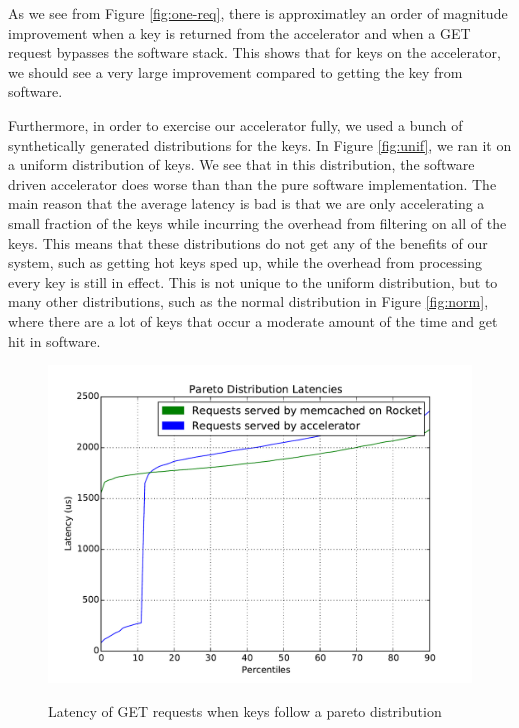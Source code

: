 As we see from Figure \ref{fig:one-req}, there is approximatley an order of magnitude
improvement when a key is returned from the accelerator and when a GET request
bypasses the software stack. This shows that for keys on the accelerator, we
should see a very large improvement compared to getting the key from software.

Furthermore, in order to exercise our accelerator fully, we used a bunch of
synthetically generated distributions for the keys. In Figure \ref{fig:unif},
we ran it on a uniform distribution of keys. We see that in this distribution,
the software driven accelerator does worse than than the pure software
implementation. The main reason that the average latency is bad is that we are
only accelerating a small fraction of the keys while incurring the overhead
from filtering on all of the keys. This means that these distributions do not
get any of the benefits of our system, such as getting hot keys sped up, while
the overhead from processing every key is still in effect. This is not unique
to the uniform distribution, but to many other distributions, such as the
normal distribution in Figure \ref{fig:norm}, where there are a lot of keys
that occur a moderate amount of the time and get hit in software.

\begin{figure}[t]
\begin{center}
\label{fig:pareto}
\includegraphics[width=\linewidth]{pareto.pdf}
\caption{Latency of GET requests when keys follow a pareto distribution}
\end{center}
\end{figure}

